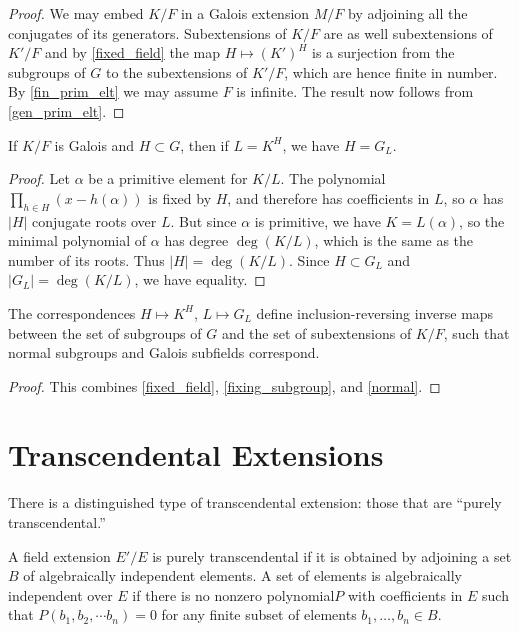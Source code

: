 \begin{proof} We may embed $K/F$ in a Galois extension $M/F$ by adjoining all
the conjugates of its generators. Subextensions of $K/F$ are as well
subextensions
of $K'/F$ and by \ref{fixed_field} the map $H \mapsto (K')^H$ is a surjection
from the subgroups of $G$ to the subextensions of $K'/F$, which are hence
finite in number. By \ref{fin_prim_elt} we may assume $F$ is infinite. The
result now follows from \ref{gen_prim_elt}. \end{proof}

\begin{lemma}
 If $K/F$ is Galois and $H \subset G$, then if $L = K^H$, we have $H = G_L$.
 \label{fixing_subgroup}
\end{lemma}

\begin{proof}
 Let $\alpha$ be a primitive element for $K/L$. The polynomial $\prod_{h \in
H} (x - h(\alpha))$ is fixed by $H$, and therefore has coefficients in $L$, so
$\alpha$ has $|H|$ conjugate roots over $L$. But since $\alpha$ is primitive,
we have $K = L(\alpha)$, so the minimal polynomial of $\alpha$ has degree
$\deg(K/L)$, which is the same as the number of its roots. Thus $|H| =
\deg(K/L)$. Since $H \subset G_L$ and $|G_L| = \deg(K/L)$, we have equality.
\end{proof}


\begin{theorem} The correspondences $H \mapsto K^H$, $L \mapsto G_L$ define
inclusion-reversing inverse maps between the set of subgroups of $G$ and the
set of subextensions of $K/F$, such that normal subgroups and Galois subfields
correspond.
\label{fundamental_theorem}
\end{theorem}

\begin{proof} This combines \ref{fixed_field}, \ref{fixing_subgroup}, and
\ref{normal}.
\end{proof}


\section{Transcendental Extensions}


There is a distinguished type of transcendental extension: those that are
``purely transcendental.''
\begin{definition} A field extension $E'/E$ is purely transcendental if it is
obtained by adjoining a set $B$ of algebraically independent elements. A set of
elements is algebraically independent over $E$ if there is no nonzero
polynomial$P$
with coefficients in $E$ such
that $P(b_1,b_2,\cdots b_n)=0$ for any finite subset of elements $b_1, \dots,
b_n \in B$.
\end{definition}

